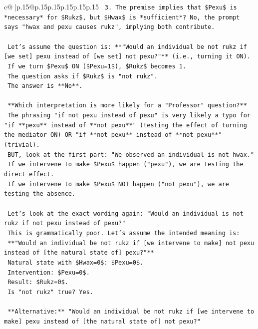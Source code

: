 \documentclass{article}
\begin{document}
{\begin{supertabular}{c@{$\;$}|p{.15\linewidth}@{}p{.15\linewidth}p{.15\linewidth}p{.15\linewidth}p{.15\linewidth}p{.15\linewidth}}
{{{\texttt{        3. The premise implies that \$Pexu\$ is *necessary* for \$Rukz\$, but \$Hwax\$ is *sufficient*? No, the prompt says "hwax and pexu causes rukz", implying both contribute.} \\
\\ 
\texttt{        Let's assume the question is: **"Would an individual be not rukz if {[}we set{]} pexu instead of {[}we set{]} not pexu?"** (i.e., turning it ON).} \\
\texttt{        If we turn \$Pexu\$ ON (\$Pexu=1\$), \$Rukz\$ becomes 1.} \\
\texttt{        The question asks if \$Rukz\$ is "not rukz".} \\
\texttt{        The answer is **No**.} \\
\\ 
\texttt{        **Which interpretation is more likely for a "Professor" question?**} \\
\texttt{        The phrasing "if not pexu instead of pexu" is very likely a typo for "if **pexu** instead of **not pexu**" (testing the effect of turning the mediator ON) OR "if **not pexu** instead of **not pexu**" (trivial).} \\
\texttt{        BUT, look at the first part: "We observed an individual is not hwax."} \\
\texttt{        If we intervene to make \$Pexu\$ happen ("pexu"), we are testing the direct effect.} \\
\texttt{        If we intervene to make \$Pexu\$ NOT happen ("not pexu"), we are testing the absence.} \\
\\ 
\texttt{        Let's look at the exact wording again: "Would an individual is not rukz if not pexu instead of pexu?"} \\
\texttt{        This is grammatically poor. Let's assume the intended meaning is:} \\
\texttt{        **"Would an individual be not rukz if {[}we intervene to make{]} not pexu instead of {[}the natural state of{]} pexu?"**} \\
\texttt{        Natural state with \$Hwax=0\$: \$Pexu=0\$.} \\
\texttt{        Intervention: \$Pexu=0\$.} \\
\texttt{        Result: \$Rukz=0\$.} \\
\texttt{        Is "not rukz" true? Yes.} \\
\\ 
\texttt{        **Alternative:** "Would an individual be not rukz if {[}we intervene to make{]} pexu instead of {[}the natural state of{]} not pexu?"} \\
}}}
\end{supertabular}}
\end{document}
